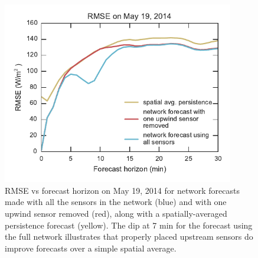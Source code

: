 \begin{figure}[t]
 \centering
 \includegraphics[width=0.9\textwidth]{figs/missing.pdf}
 \caption{RMSE vs forecast horizon on May 19, 2014 for network forecasts made with all the sensors in the network (blue) and with one upwind sensor removed (red), along with a spatially-averaged persistence forecast (yellow). The dip at 7 min for the forecast using the full network illustrates that properly placed upstream sensors do improve forecasts over a simple spatial average.}
\label{fig:circuitbreak}
\end{figure}

